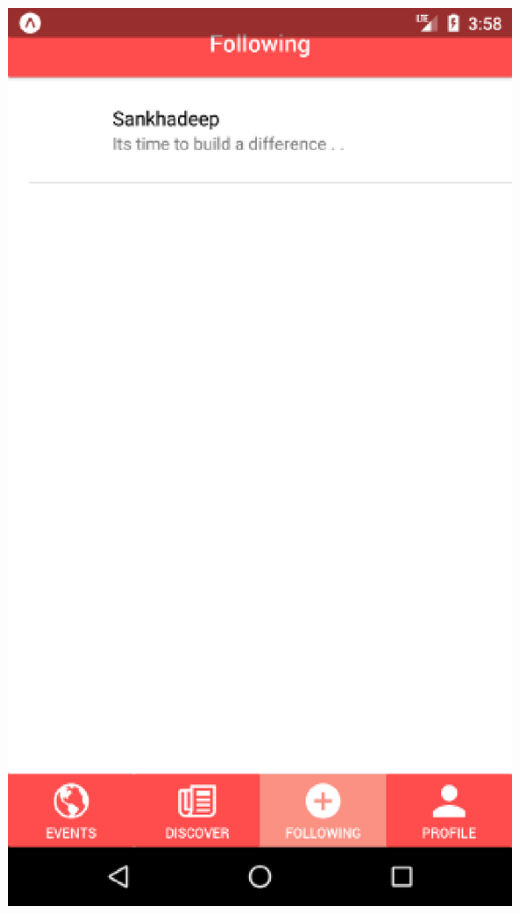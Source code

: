 \documentclass[letterpaper, 10pt,titlepage]{article}
\begin{document}
\includegraphics{Following_Screen.eps}
\newpage
\end{document}
